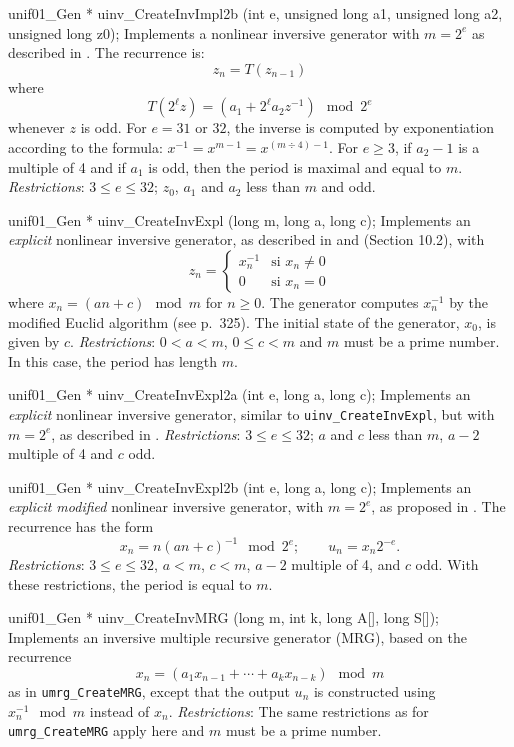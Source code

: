 unif01_Gen * uinv_CreateInvImpl2b (int e, unsigned long a1,
                                   unsigned long a2, unsigned long z0);
\endcode
  \tab Implements a nonlinear inversive generator with $m = 2^e$
   as described in \cite{rEIC92d}. 
   The recurrence is:
     $$ z_n = T(z_{n-1}) $$
   where
     $$ T(2^\ell z) = (a_1 + 2^\ell a_2 z^{-1}) \mod 2^e $$
   whenever $z$ is odd.
   For $e = 31$ or $32$, the inverse is computed by exponentiation 
   according to the formula:
   $x^{-1} = x^{m-1} = x^{(m \div 4) - 1}$.
   For $e\ge 3$, if $a_2-1$ is a multiple of 4 and if $a_1$ is odd, 
   then the period is maximal and equal to $m$.
   \emph{Restrictions}:  $3 \le e \le 32$; $z_0$, $a_1$ and $a_2$ less than
   $m$ and odd.
  \endtab
\code


unif01_Gen * uinv_CreateInvExpl (long m, long a, long c);
\endcode
  \tab Implements an  {\em explicit\/} nonlinear inversive generator,
   as described in \cite{rEIC93a} and
   \cite{rLEC94a} (Section 10.2), with
    \[ z_n = \left\{ 
     \begin{array}{ll} 
       x_n^{-1} & \mbox{si $x_n\not=0$}\\[6pt] 
       0        & \mbox{si $x_n = 0$} 
     \end{array} \right. \]
   where $x_n = (an+c) \mod m$ for $n \ge 0$. 
   The generator computes 
   $x_n^{-1}$ by the modified Euclid algorithm (see \cite{rKNU81a}
   p.~325). The initial state of the generator, $x_0$, is given by
   $c$.  \emph{Restrictions}: $0 < a < m$, $0 \le c < m$ and $m$ must be a prime
   number.  In this case, the period has length $m$.
  \endtab
\code


unif01_Gen * uinv_CreateInvExpl2a (int e, long a, long c);
\endcode
  \tab Implements  an  {\em explicit\/} nonlinear inversive generator,
  similar to {\tt uinv\_CreateInvExpl}, but with
   $m = 2^e$, as described in \cite{rEIC94b}.
   \emph{Restrictions}:  $3 \le e \le 32$; $a$ and $c$ less than $m$,
   $a-2$ multiple of 4 and $c$ odd.
  \endtab
\code


unif01_Gen * uinv_CreateInvExpl2b (int e, long a, long c);
\endcode
  \tab Implements an  {\em explicit modified\/}
   nonlinear inversive generator, with $m = 2^e$, as proposed 
   in \cite{rEIC95d}.   The recurrence has the form
    $$ x_n = n(an + c)^{-1} \mod 2^e; \qquad u_n = x_n 2^{-e}. $$
   \emph{Restrictions}:  $3 \le e \le 32$, $a < m$, $c < m$, 
   $a-2$ multiple of 4, and $c$ odd.
   With these restrictions, the period is equal to $m$.
  \endtab
\code


unif01_Gen * uinv_CreateInvMRG (long m, int k, long A[], long S[]);
\endcode
  \tab  Implements an inversive multiple recursive generator (MRG),
   based on the recurrence
    $$ x_n = (a_1 x_{n-1} + \cdots + a_k x_{n-k}) \mod m $$ 
   as in {\tt umrg\_CreateMRG}, except that the output $u_n$ is 
   constructed using $x_n^{-1} \mod m$ instead of $x_n$.
   \emph{Restrictions}: The same restrictions as for {\tt umrg\_CreateMRG}
   apply here and $m$ must be a prime number.
  \endtab
\code


